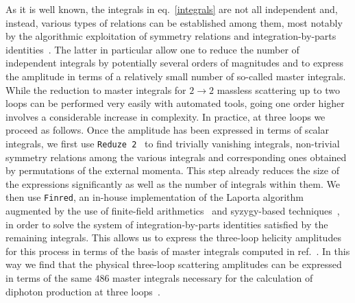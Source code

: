 As it is well known, the integrals in eq.~\eqref{integrals} are not
all independent and, instead, various types of relations can be
established among them, most notably by the algorithmic exploitation
of symmetry relations and integration-by-parts
identities~\cite{Tkachov:1981wb,Chetyrkin:1981qh}.  The latter in
particular allow one to reduce the number of independent integrals by
potentially several orders of magnitudes and to express the amplitude in terms of
a relatively small number of so-called master integrals.  While the
reduction to master integrals for $2 \to 2$ massless scattering up to
two loops can be performed very easily with automated tools, going one
order higher involves a considerable increase in complexity.  In
practice, at three loops we proceed as follows. Once the amplitude has
been expressed in terms of scalar integrals, we first use
\texttt{Reduze 2}~\cite{Studerus:2009ye,vonManteuffel:2012np} to find
trivially vanishing integrals, non-trivial symmetry relations among
the various integrals and corresponding ones obtained by permutations
of the external momenta.  This step already reduces the size of the
expressions significantly as well as the number of integrals within them.  We then use
\texttt{Finred}, an in-house implementation of the Laporta
algorithm~\cite{Laporta:2001dd} augmented by the use of finite-field
arithmetics~\cite{vonManteuffel:2014ixa,
  vonManteuffel:2016xki,Peraro:2016wsq,Peraro:2019svx} and
syzygy-based
techniques~\cite{Gluza:2010ws,Schabinger:2011dz,Ita:2015tya,Larsen:2015ped,Bohm:2017qme,Agarwal:2020dye},
in order to solve the system of integration-by-parts
identities satisfied by the remaining integrals.
This allows us to express the three-loop helicity
amplitudes for this process in terms of the basis of master integrals
computed in ref.~\cite{Henn:2020lye}. In this way we find that the
physical three-loop scattering amplitudes can be expressed in terms of
the same $486$ master integrals necessary for the calculation of
diphoton production at three loops~\cite{Caola:2020dfu}.
